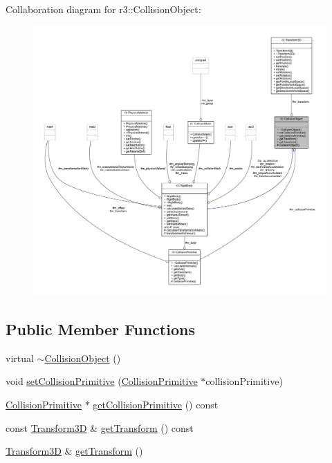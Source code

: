 Collaboration diagram for r3\+:\+:Collision\+Object\+:\nopagebreak
\begin{figure}[H]
\begin{center}
\leavevmode
\includegraphics[width=350pt]{classr3_1_1_collision_object__coll__graph}
\end{center}
\end{figure}
\subsection*{Public Member Functions}
\begin{DoxyCompactItemize}
\item 
virtual \mbox{\hyperlink{classr3_1_1_collision_object_a26f7c8a9adb08718c98dce736cc89830}{$\sim$\+Collision\+Object}} ()
\item 
void \mbox{\hyperlink{classr3_1_1_collision_object_afaf76460298998bcbe405c0b2e6de6a6}{set\+Collision\+Primitive}} (\mbox{\hyperlink{classr3_1_1_collision_primitive}{Collision\+Primitive}} $\ast$collision\+Primitive)
\item 
\mbox{\hyperlink{classr3_1_1_collision_primitive}{Collision\+Primitive}} $\ast$ \mbox{\hyperlink{classr3_1_1_collision_object_aabb0d7173dacef5ffc02163557f55fa4}{get\+Collision\+Primitive}} () const
\item 
const \mbox{\hyperlink{classr3_1_1_transform3_d}{Transform3D}} \& \mbox{\hyperlink{classr3_1_1_collision_object_a79e04809124cad6aeb25a66f11826fee}{get\+Transform}} () const
\item 
\mbox{\hyperlink{classr3_1_1_transform3_d}{Transform3D}} \& \mbox{\hyperlink{classr3_1_1_collision_object_acc41118b9a571e5aa918644aaeda6bfa}{get\+Transform}} ()
\end{DoxyCompactItemize}
